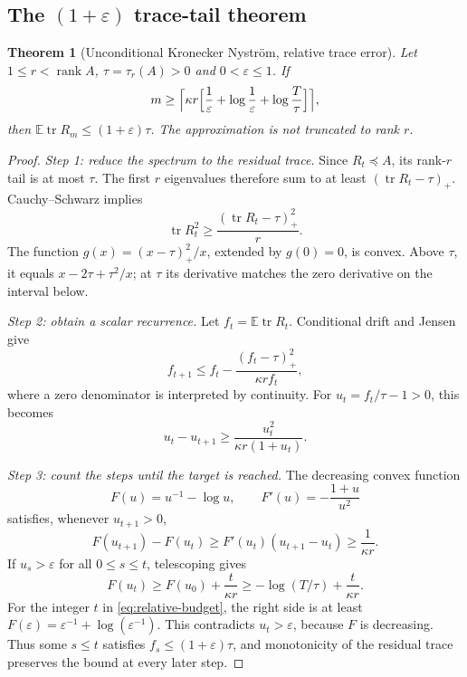 \documentclass[11pt,a4paper]{article}
\newtheorem{theorem}{Theorem}[section]
\theoremstyle{definition}\newtheorem{definition}[theorem]{Definition}
\theoremstyle{remark}\newtheorem{remark}[theorem]{Remark}
\numberwithin{equation}{section}
\newcommand{\E}{\mathbb E}
\newcommand{\tr}{\operatorname{tr}}
\newcommand{\rank}{\operatorname{rank}}
\newcommand{\eps}{\varepsilon}
\begin{document}
\subsection{The \texorpdfstring{$(1+\eps)$}{(1+eps)} trace-tail theorem}
\begin{theorem}[Unconditional Kronecker Nystr\"om, relative trace error]\label{thm:relative}
Let $1\le r<\rank A$, $\tau=\tau_r(A)>0$ and $0<\eps\le1$. If
\begin{equation}\label{eq:relative-budget}
 m\ge\Bigl\lceil\kappa r\Bigl[\frac1\eps+\log\frac1\eps+\log\frac T\tau\Bigr]\Bigr\rceil,
\end{equation}
then $\E\tr R_m\le(1+\eps)\tau$. The approximation is not truncated to rank $r$.
\end{theorem}
\begin{proof}
\emph{Step 1: reduce the spectrum to the residual trace.}
Since \(R_t\preceq A\), its rank-\(r\) tail is at most \(\tau\).
The first \(r\) eigenvalues therefore sum to at least
\((\tr R_t-\tau)_+\). Cauchy--Schwarz implies
\[
 \tr R_t^2\ge\frac{(\tr R_t-\tau)_+^2}{r}.
\]
The function \(g(x)=(x-\tau)_+^2/x\), extended by \(g(0)=0\), is convex.
Above \(\tau\), it equals \(x-2\tau+\tau^2/x\); at \(\tau\) its derivative
matches the zero derivative on the interval below.

\emph{Step 2: obtain a scalar recurrence.}
Let \(f_t=\E\tr R_t\). Conditional drift and Jensen give
\begin{equation}\label{eq:cooling}
 f_{t+1}\le f_t-\frac{(f_t-\tau)_+^2}{\kappa r f_t},
\end{equation}
where a zero denominator is interpreted by continuity.
For \(u_t=f_t/\tau-1>0\), this becomes
\[
 u_t-u_{t+1}\ge\frac{u_t^2}{\kappa r(1+u_t)}.
\]

\emph{Step 3: count the steps until the target is reached.}
The decreasing convex function
\[
 F(u)=u^{-1}-\log u,
 \qquad F'(u)=-\frac{1+u}{u^2}
\]
satisfies, whenever \(u_{t+1}>0\),
\[
 F(u_{t+1})-F(u_t)
 \ge F'(u_t)(u_{t+1}-u_t)
 \ge\frac1{\kappa r}.
\]
If \(u_s>\eps\) for all \(0\le s\le t\), telescoping gives
\[
 F(u_t)\ge F(u_0)+\frac{t}{\kappa r}
 \ge-\log(T/\tau)+\frac{t}{\kappa r}.
\]
For the integer \(t\) in \eqref{eq:relative-budget}, the right side
is at least \(F(\eps)=\eps^{-1}+\log(\eps^{-1})\).
This contradicts \(u_t>\eps\), because \(F\) is decreasing.
Thus some \(s\le t\) satisfies \(f_s\le(1+\eps)\tau\), and monotonicity
of the residual trace preserves the bound at every later step.
\end{proof}
\end{document}
